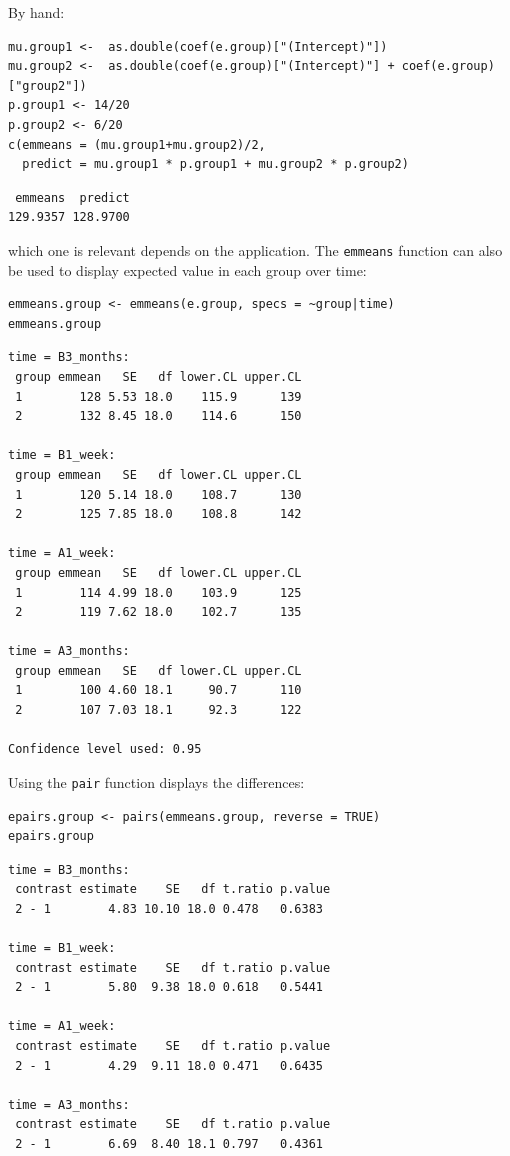 \documentclass[12pt]{article}
\begin{document}
By hand:
\lstset{language=r,label= ,caption= ,captionpos=b,numbers=none}
\begin{lstlisting}
mu.group1 <-  as.double(coef(e.group)["(Intercept)"])
mu.group2 <-  as.double(coef(e.group)["(Intercept)"] + coef(e.group)["group2"])
p.group1 <- 14/20
p.group2 <- 6/20
c(emmeans = (mu.group1+mu.group2)/2,
  predict = mu.group1 * p.group1 + mu.group2 * p.group2)
\end{lstlisting}

\begin{verbatim}
 emmeans  predict 
129.9357 128.9700
\end{verbatim}


which one is relevant depends on the application. The \texttt{emmeans}
function can also be used to display expected value in each group over
time:
\lstset{language=r,label= ,caption= ,captionpos=b,numbers=none}
\begin{lstlisting}
emmeans.group <- emmeans(e.group, specs = ~group|time)
emmeans.group
\end{lstlisting}

\begin{verbatim}
time = B3_months:
 group emmean   SE   df lower.CL upper.CL
 1        128 5.53 18.0    115.9      139
 2        132 8.45 18.0    114.6      150

time = B1_week:
 group emmean   SE   df lower.CL upper.CL
 1        120 5.14 18.0    108.7      130
 2        125 7.85 18.0    108.8      142

time = A1_week:
 group emmean   SE   df lower.CL upper.CL
 1        114 4.99 18.0    103.9      125
 2        119 7.62 18.0    102.7      135

time = A3_months:
 group emmean   SE   df lower.CL upper.CL
 1        100 4.60 18.1     90.7      110
 2        107 7.03 18.1     92.3      122

Confidence level used: 0.95
\end{verbatim}

\clearpage

Using the \texttt{pair} function displays the differences:
\lstset{language=r,label= ,caption= ,captionpos=b,numbers=none}
\begin{lstlisting}
epairs.group <- pairs(emmeans.group, reverse = TRUE)
epairs.group
\end{lstlisting}

\begin{verbatim}
time = B3_months:
 contrast estimate    SE   df t.ratio p.value
 2 - 1        4.83 10.10 18.0 0.478   0.6383 

time = B1_week:
 contrast estimate    SE   df t.ratio p.value
 2 - 1        5.80  9.38 18.0 0.618   0.5441 

time = A1_week:
 contrast estimate    SE   df t.ratio p.value
 2 - 1        4.29  9.11 18.0 0.471   0.6435 

time = A3_months:
 contrast estimate    SE   df t.ratio p.value
 2 - 1        6.69  8.40 18.1 0.797   0.4361
\end{verbatim}
\end{document}
